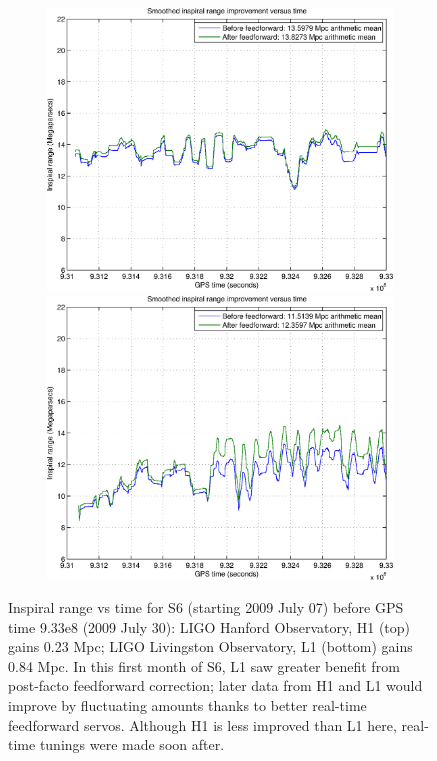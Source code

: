 \begin{figure}
\begin{center}
\includegraphics[height=75mm, width=150mm]{figure14a.eps}
\includegraphics[height=75mm, width=150mm]{figure14b.eps}
\caption{Inspiral range vs time for S6 (starting 2009 July 07) before GPS time 9.33e8 (2009 July 30):
LIGO Hanford Observatory, H1 (top) gains 0.23 Mpc; LIGO Livingston Observatory, L1 (bottom) gains 0.84 Mpc. In this first month of S6, L1 saw greater benefit from post-facto feedforward correction; later data from H1 and L1 would improve by fluctuating amounts thanks to better real-time feedforward servos. Although H1 is less improved than L1 here, real-time tunings were made soon after.}
\label{S6inspiralRange}
\end{center}
\end{figure}
